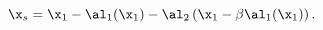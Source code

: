 \begin{equation}
\x_s = \x_1 - \al_1(\x_1) - \al_2\left(\x_1 - \beta \al_1(\x_1)\right).
\label{eq:twoplane}
\end{equation}